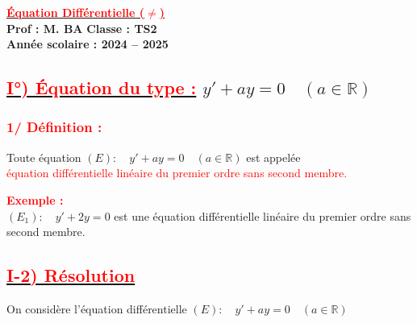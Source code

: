 \documentclass[12pt,a4paper]{article}
\begin{document}
\begin{center}
    \Large\textbf{\underline{\textcolor{red}{Équation Différentielle (\(\neq\))}}}\\[-0.1cm]
    \normalsize\textbf{Prof : M. BA} \hfill \textbf{Classe : TS2}\\[-0.1cm]
    \textbf{Année scolaire : 2024 -- 2025}
\end{center}




\subsection*{\underline{\textcolor{red}{I°) Équation du type :}} \quad \( y' + ay = 0 \quad (a \in \mathbb{R}) \)}

\subsubsection*{\textcolor{red}{1/ Définition :}}

Toute équation \((E):\quad y' + ay = 0 \quad (a \in \mathbb{R})\) est appelée \\
\textcolor{red}{équation différentielle linéaire du premier ordre sans second membre.}

\vspace{0.5cm}

\textbf{\textcolor{red}{Exemple :}} \\
\((E_1):\quad y' + 2y = 0\) est une équation différentielle linéaire du premier ordre sans second membre.

\subsection*{\underline{\textcolor{red}{I-2) Résolution}}}

On considère l'équation différentielle \((E) :\quad y' + ay = 0 \quad (a \in \mathbb{R})\)

\vspace{0.3cm}
\end{document}
